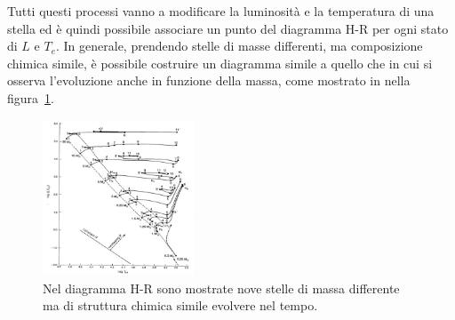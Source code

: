 Tutti questi processi vanno a modificare la luminosità e la temperatura di una stella ed è quindi possibile associare un punto del diagramma H-R per ogni stato di $L$ e $T_e$. In generale, prendendo stelle di masse differenti, ma composizione chimica simile, è possibile costruire un diagramma simile a quello che in cui si osserva l'evoluzione anche in funzione della massa, come mostrato in nella figura~\ref{fig:evo}.
\begin{figure}
    \centering
    \includegraphics[width=0.4\textwidth]{immagini/evo.png}
    \caption{Nel diagramma H-R sono mostrate nove stelle di massa differente ma di struttura chimica simile evolvere nel tempo.}\label{fig:evo}
\end{figure}
